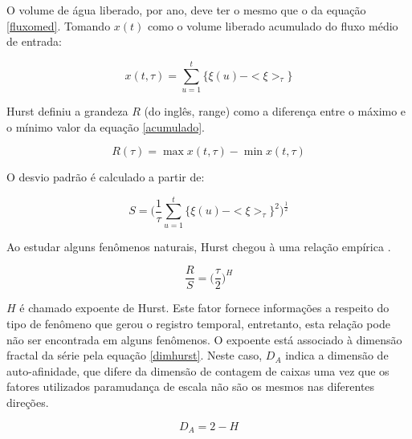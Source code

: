 \documentclass{ufscThesis}
\begin{document}
O volume de água liberado, por ano, deve ter o mesmo que o da equação \ref{fluxomed}. Tomando $x(t)$ como o volume liberado acumulado do fluxo médio de entrada:

\begin{equation}
x(t,\tau) = \sum_{u=1}^{t}\{\xi(u) - <\xi>_{\tau}\}
\label{acumulado}
\end{equation}

Hurst definiu a grandeza $R$ (do inglês, range) como a diferença entre o máximo e o mínimo valor da equação \ref{acumulado}.

\begin{equation}
R(\tau) = \max x(t,\tau) - \min x(t,\tau)
\label{range}
\end{equation}

O desvio padrão é calculado a partir de:

\begin{equation}
S = \bigg( \frac{1}{\tau} \sum_{u=1}^{t}\{\xi(u) - <\xi>_{\tau}\}^{2} \bigg)^{\frac{1}{2}}
\label{desviop}
\end{equation}

Ao estudar alguns fenômenos naturais, Hurst chegou à uma relação empírica \cite{feder1988fractals}.

\begin{equation}
\frac{R}{S} = \bigg(\frac{\tau}{2}\bigg)^{H}
\end{equation}

$H$ é chamado expoente de Hurst. Este fator fornece informações a respeito do tipo de fenômeno que gerou o registro temporal, entretanto, esta relação pode não ser encontrada em alguns fenômenos. O expoente está associado à dimensão fractal da série pela equação \ref{dimhurst}. Neste caso, $D_{A}$ indica a dimensão de auto-afinidade, que difere da dimensão de contagem de caixas uma vez que os fatores utilizados paramudança de escala não são os mesmos nas diferentes direções.

\begin{equation}
D_{A} = 2 - H
\label{dimhurst}
\end{equation}
\end{document}
